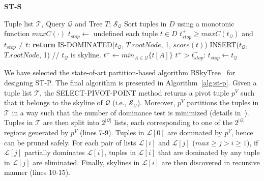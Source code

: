 \begin{algorithm}[htb]
\caption{{\bf ST-S}}
\begin{algorithmic}[1]
\label{alg:st-s}
 Tuple list $\mathcal{T}$, Query $\mathcal{Q}$ and Tree $T$;  $\mathcal{S}_\mathcal{Q}$
\STATE Sort tuples in $D$ using a monotonic function $maxC(\cdot)$
\STATE $t_{stop} \leftarrow$ undefined
 each tuple $t \in D$
    \STATE {} $t_{stop}^+ \geq maxC(t_{\mathcal{Q}})$ and $t_{stop} \neq t$: {\bf return}
    \STATE {} IS-DOMINATED($t_\mathcal{Q}$, $T.rootNode$, 1, $score(t)$)
        \STATE \hindent[2] INSERT($t_\mathcal{Q}$, $T.rootNode$, 1) \qquad // $t_\mathcal{Q}$ is skyline.
        \STATE \hindent[2] $t^+ \leftarrow  min_{A \in \mathcal{Q}}\{t[A]\}$
        \STATE {} $t^+ > t_{stop}^+$: $t_{stop} \leftarrow t_{\mathcal{Q}}$
\end{algorithmic}
\end{algorithm}


\vspace{1mm}
 We have selected the state-of-art partition-based algorithm BSkyTree~\cite{lee2014scalable} for designing ST-P. The final algorithm is presented in Algorithm~\ref{alg:st-p}. Given a tuple list $\mathcal{T}$, the SELECT-PIVOT-POINT method returns a pivot tuple $p^V$ such that it belongs to the skyline of $\mathcal{Q}$ (i.e., $\mathcal{S_{\mathcal{Q}}}$). Moreover, $p^V$ partitions the tuples in $\mathcal{T}$ in a way such that the number of dominance test is minimized (details in~\cite{lee2014scalable}). Tuples in $\mathcal{T}$ are then split into $2^{|\mathcal{Q}|}$ lists, each corresponding to one of the $2^{|\mathcal{Q}|}$ regions generated by $p^V$ (lines 7-9). Tuples in $\mathcal{L}[0]$ are dominated by $p^V$, hence can be pruned safely. For each pair of lists $\mathcal{L}[i]$ and $\mathcal{L}[j]$ ($max \geq j> i \geq 1$), if $\mathcal{L}[j]$ partially dominates $\mathcal{L}[i]$, tuples in $\mathcal{L}[i]$ that are dominated by any tuple in $\mathcal{L}[j]$ are eliminated. Finally, skylines in $\mathcal{L}[i]$ are then discovered in recursive manner (lines 10-15).

